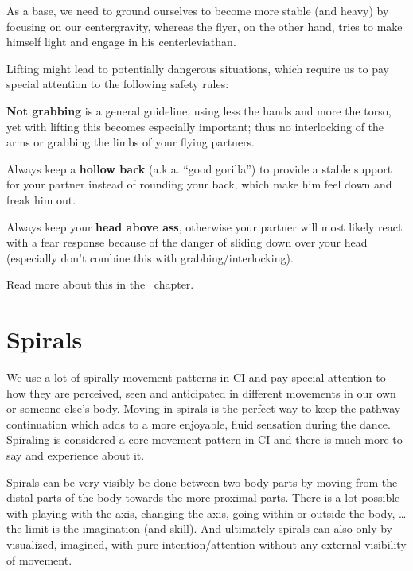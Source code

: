 As a base, we need to ground ourselves to become more stable (and heavy) by focusing on our \gls{centergravity},
whereas the flyer, on the other hand, tries to make himself light and engage in his \gls{centerleviathan}.

Lifting might lead to potentially dangerous situations, which require us to pay special attention to the following safety rules:

\begin{itemize*}
    \item \textbf{Not grabbing} is a general guideline, using less the hands and more the torso, yet with lifting this becomes especially important; thus no interlocking of the arms or grabbing the limbs of your flying partners.
    \item Always keep a \textbf{hollow back} (a.k.a. ``good gorilla'') to provide a stable support for your partner instead of rounding your back, which make him feel down and freak him out.
    \item Always keep your \textbf{head above ass}, otherwise your partner will most likely react with a fear response because of the danger of sliding down over your head (especially don't combine this with grabbing/interlocking).
\end{itemize*}

Read more about this in the~ chapter.

\section{Spirals}\label{sec:spirals}

We use a lot of spirally movement patterns in CI and pay special attention to how they are perceived, seen and anticipated in different movements in our own or someone else's body.
Moving in spirals is the perfect way to keep the pathway continuation which adds to a more enjoyable, fluid sensation during the dance.
Spiraling is considered a core movement pattern in CI and there is much more to say and experience about it.

Spirals can be very visibly be done between two body parts by moving from the distal parts of the body towards the more proximal parts.
There is a lot possible with playing with the axis, changing the axis, going within or outside the body, \ldots the limit is the imagination (and skill).
And ultimately spirals can also only by visualized, imagined, with pure intention/attention without any external visibility of movement.

